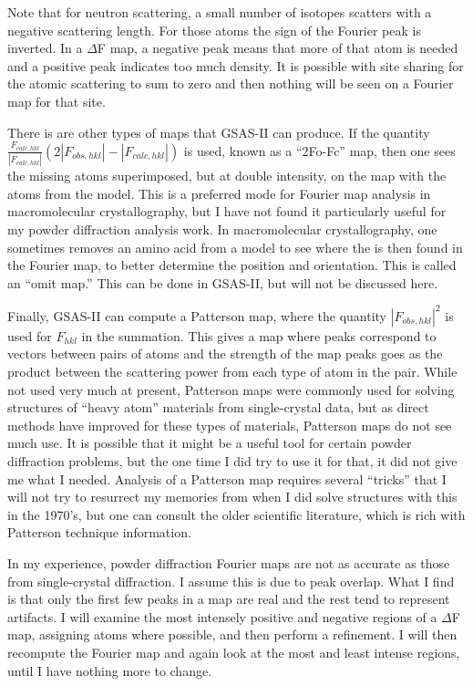 Note that for neutron scattering, a small number of isotopes scatters with a negative scattering length. For those atoms the sign of the Fourier peak is inverted. In a $\Delta$F map, a negative peak means that more of that atom is needed and a positive peak indicates too much density. It is possible with site sharing for the atomic scattering to sum to zero and then nothing will be seen on a Fourier map for that site.

There is are other types of maps that GSAS-II can produce. If the quantity $\frac{F_{calc, hkl}}{|F_{calc, hkl}|}(2|F_{obs, hkl}| - |F_{calc, hkl}|)$  is used, known as a ``2Fo-Fc'' map, then one sees the missing atoms superimposed, but at double intensity, on the map with the atoms from the model. This is a preferred mode for Fourier map analysis in macromolecular crystallography, but I have not found it particularly useful for my powder diffraction analysis work. In macromolecular crystallography, one sometimes removes an amino acid from a model to see where the is then found in the Fourier map, to better determine the position and orientation. This is called an ``omit map.''  This can be done in GSAS-II, but will not be discussed here. 

Finally, GSAS-II can compute a Patterson map, where the quantity  $|F_{obs, hkl}|^2$ is used for  $F_{hkl}$ in the summation. This gives a map where peaks correspond to vectors between pairs of atoms and the strength of the map peaks goes as the product between the scattering power from each type of atom in the pair. While not used very much at present, Patterson maps were commonly used for solving structures of ``heavy atom'' materials from single-crystal data, but as direct methods have improved for these types of materials, Patterson maps do not see much use. It is possible that it might be a useful tool for certain powder diffraction problems, but the one time I did try to use it for that, it did not give me what I needed. Analysis of a Patterson map requires several ``tricks'' that I will not try to resurrect my memories from when I did solve structures with this in the 1970's, but one can consult the older scientific literature, which is rich with Patterson technique information. 

In my experience, powder diffraction Fourier maps are not as accurate as those from single-crystal diffraction. I assume this is due to peak overlap. What I find is that only the first few peaks in a map are real and the rest tend to represent artifacts. I will examine the most intensely positive and negative regions of a $\Delta$F map, assigning atoms where possible, and then perform a refinement. I will then recompute the Fourier map and again look at the most and least intense regions, until I have nothing more to change. 

